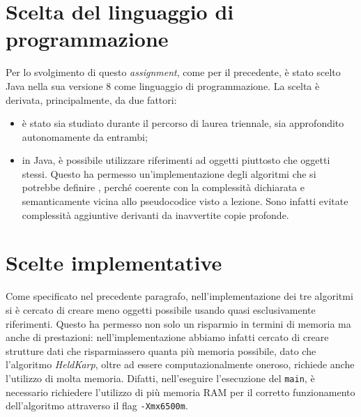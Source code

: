 \section{Scelta del linguaggio di programmazione}
Per lo svolgimento di questo \emph{assignment}, come per il precedente, è stato scelto Java nella sua versione 8 come linguaggio di programmazione. La scelta è derivata, principalmente, da due fattori: 
\begin{itemize}
	\item è stato sia studiato durante il percorso di laurea triennale, sia approfondito autonomamente da entrambi;
	\item in Java, è possibile utilizzare riferimenti ad oggetti piuttosto che oggetti stessi. Questo ha permesso un'implementazione degli algoritmi che si potrebbe definire , perché coerente con la complessità dichiarata e semanticamente vicina allo pseudocodice visto a lezione. Sono infatti evitate complessità aggiuntive derivanti da inavvertite copie profonde.
\end{itemize}

\section{Scelte implementative}
Come specificato nel precedente paragrafo, nell'implementazione dei tre algoritmi si è cercato di creare meno oggetti possibile usando quasi esclusivamente riferimenti. Questo ha permesso non solo un risparmio in termini di memoria ma anche di prestazioni: nell'implementazione abbiamo infatti cercato di creare strutture dati che risparmiassero quanta più memoria possibile, dato che l'algoritmo \textit{HeldKarp}, oltre ad essere computazionalmente oneroso, richiede anche l'utilizzo di molta memoria. Difatti, nell'eseguire l'esecuzione del \texttt{main}, è necessario richiedere l'utilizzo di più memoria RAM per il corretto funzionamento dell'algoritmo attraverso il flag \texttt{-Xmx6500m}. 

